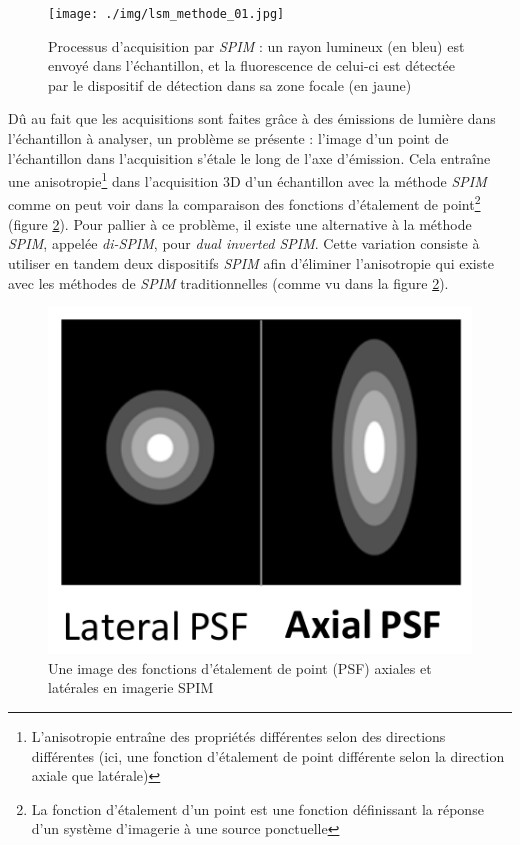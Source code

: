 {{		\begin{figure}[H]
			\centering
			\texttt{[image: ./img/lsm\_methode\_01.jpg]}
			\caption{Processus d'acquisition par \textit{SPIM} : un rayon lumineux (en bleu) est envoyé dans l'échantillon, et la fluorescence de celui-ci est détectée par le dispositif de détection dans sa zone focale (en jaune)}
			\label{img:lsm_01_how_it_works}
		\end{figure}

		Dû au fait que les acquisitions sont faites grâce à des émissions de lumière dans l'échantillon à analyser, un problème se présente : l'image d'un point de l'échantillon dans l'acquisition s'étale le long de l'axe d'émission. Cela entraîne une anisotropie\footnote{L'anisotropie entraîne des propriétés différentes selon des directions différentes (ici, une fonction d'étalement de point différente selon la direction axiale que latérale)} dans l'acquisition 3D d'un échantillon avec la méthode \textit{SPIM} comme on peut voir dans la comparaison des fonctions d'étalement de point\footnote{La fonction d'étalement d'un point est une fonction définissant la réponse d'un système d'imagerie à une source ponctuelle\label{fn:psf}} (figure \ref{img:spim_01_point_spread_function}). Pour pallier à ce problème, il existe une alternative à la méthode \textit{SPIM}, appelée \textit{di-SPIM}, pour \textit{dual inverted SPIM}. Cette variation consiste à utiliser en tandem deux dispositifs \textit{SPIM} afin d'éliminer l'anisotropie qui existe avec les méthodes de \textit{SPIM} traditionnelles (comme vu dans la figure \ref{img:spim_01_point_spread_function}).\par

		\begin{figure}[!htp]
			\centering
			\includegraphics[width=0.3\linewidth]{./img/spim_01_psf.png}
			\caption{Une image des fonctions d'étalement de point (PSF) axiales et latérales en imagerie SPIM}
			\label{img:spim_01_point_spread_function}
		\end{figure}

}}
